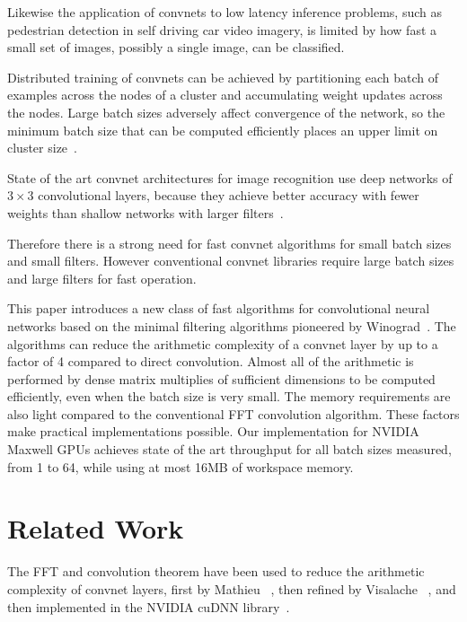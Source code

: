 \documentclass[10pt,twocolumn,letterpaper]{article}
\begin{document}
Likewise the application of convnets to low latency inference problems, such as pedestrian detection in self driving car video imagery, is limited by how fast a small set of images, possibly a single image, can be classified.

Distributed training of convnets can be achieved by partitioning each batch of examples across the nodes of a cluster and accumulating weight updates across the nodes. Large batch sizes adversely affect convergence of the network, so the minimum batch size that can be computed efficiently places an upper limit on cluster size~\cite{krizhevsky2014one,gupta2015model}.

State of the art convnet architectures for image recognition use deep networks of $3\times 3$ convolutional layers, because they achieve better accuracy with fewer weights than shallow networks with larger filters~\cite{simonyan2014very,ioffe2015batch}.

Therefore there is a strong need for fast convnet algorithms for small batch sizes and small filters. However conventional convnet libraries require large batch sizes and large filters for fast operation.

This paper introduces a new class of fast algorithms for convolutional neural networks based on the minimal filtering algorithms pioneered by Winograd~\cite{winograd1980arithmetic}. The algorithms can reduce the arithmetic complexity of a convnet layer by up to a factor of 4 compared to direct convolution. Almost all of the arithmetic is performed by dense matrix multiplies of sufficient dimensions to be computed efficiently, even when the batch size is very small. The memory requirements are also light compared to the conventional FFT convolution algorithm. These factors make practical implementations possible. Our implementation for NVIDIA Maxwell GPUs achieves state of the art throughput for all batch sizes measured, from 1 to 64, while using at most 16MB of workspace memory.

\section{Related Work}

The FFT and convolution theorem have been used to reduce the arithmetic complexity of convnet layers, first by Mathieu \etal~\cite{DBLP:journals/corr/MathieuHL13}, then refined by Visalache \etal~\cite{DBLP:journals/corr/VasilacheJMCPL14}, and then implemented in the NVIDIA cuDNN library~\cite{cuDNN}.
\end{document}
